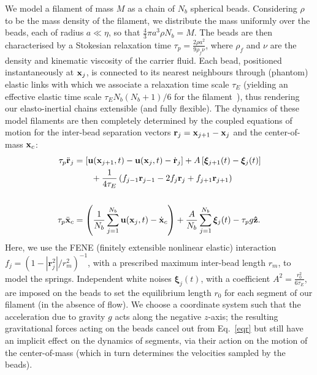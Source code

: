 \documentclass[aps,prl,twocolumn,superscriptaddress,floatfix,tightenlines,showpacs,notitlepage]{revtex4-1}
\begin{document}
We model a filament of mass $M$ as a chain of $N_b$ spherical beads.
Considering $\rho$ to be the mass density of the filament, we distribute the
mass uniformly over the beads, each of radius $a \ll \eta$, so that $\frac{4}{3}\pi
a^3\rho N_b = M$. The beads are then characterised
by a Stokesian relaxation time $\tau_p = \frac{2\rho a^2}{9\rho_f\nu}$, where
$\rho_f$ and $\nu$ are the density and kinematic viscosity of the carrier
fluid. Each bead, positioned instantaneously at ${\bf x}_j$, is connected to its nearest neighbours through (phantom) elastic links with which we associate a relaxation time scale $\tau_E$ (yielding an effective elastic
time scale ${\tau_E N_b(N_b+1)}/{6}$ for the filament~\cite{Collins2007,PicardoPRL}), thus rendering our
elasto-inertial chains extensible (and fully flexible). The dynamics of these model
filaments are then completely determined by the coupled equations of motion for the inter-bead
separation vectors ${\bf r}_j = {\bf x}_{j+1} - \textbf{x}_{j}$ and the
center-of-mass ${\bf x}_c$: 
	\begin{align} 
	\tau_p\ddot{{\bf r}}_j &= \left[{\bf u}({\bf	x}_{j+1},t)-{\bf u}({\bf x}_j,t) - \dot{{\bf r}}_j\right] + A\left [{\bm \xi}_{j+1}(t)-{\bm
		\xi}_j(t)\right ]  \nonumber\\
	&\hspace{2em}+\frac{1}{4\tau_E}\left (f_{j-1}{\bf
		r}_{j-1}-2f_{j}{\bf r}_{j}+f_{j+1}{\bf r}_{j+1}\right ) \nonumber\\
		&\hspace{8em}  \label{eqr}\\
		 \tau_p\ddot{{\bf x}}_c &=
		\left(\frac{1}{N_b}\sum_{j=1}^{N_b}{{\bf u}({\bf
		x}_j,t)}-\dot{{\bf
		x}}_c\right)+\frac{A}{N_b}\sum_{j=1}^{N_b}{\bm
		\xi}_j(t) - \tau_pg{\bf \hat z}.  \label{eqcm} 
		\end{align}
 Here, we use the FENE (finitely extensible
nonlinear elastic) interaction $f_j=(1-|\textbf{r}^2_j|/r^2_m)^{-1}$, with a
prescribed maximum inter-bead length $r_m$, to model the springs.
Independent white noises ${\bm \xi}_j(t)$, with a coefficient $A^2 = \frac{r^2_0}{6\tau_E}$, are imposed on the beads to set the equilibrium 
length $r_0$ for each segment of our filament (in the absence of flow). 
We choose a coordinate system such that the
acceleration due to gravity $g$ acts along the negative $z$-axis; the resulting
 gravitational forces acting on the
beads cancel out from Eq.~\eqref{eqr} but still
have an implicit effect on the dynamics of segments, via their action on the motion 
of the center-of-mass (which in turn determines the velocities sampled by the beads). 
\end{document}
